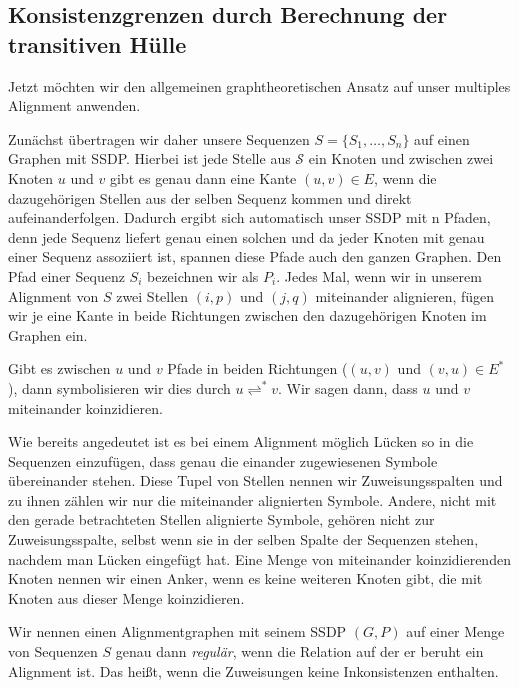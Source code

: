 \subsection{Konsistenzgrenzen durch Berechnung der transitiven Hülle}

Jetzt möchten wir den allgemeinen graphtheoretischen Ansatz auf unser multiples Alignment anwenden. 
	
\begin{definition}[Alignmentgraph]
	Zunächst übertragen wir daher unsere Sequenzen $S = \{S_1, \dots, S_n\}$ auf einen Graphen mit SSDP. Hierbei ist jede Stelle aus $\mathcal{S}$ ein Knoten und zwischen zwei Knoten $u$ und $v$ gibt es genau dann eine Kante $(u,v) \in E$, wenn die dazugehörigen Stellen aus der selben Sequenz kommen und direkt aufeinanderfolgen. Dadurch ergibt sich automatisch unser SSDP mit n Pfaden, denn jede Sequenz liefert genau einen solchen und da jeder Knoten mit genau einer Sequenz assoziiert ist, spannen diese Pfade auch den ganzen Graphen. Den Pfad einer Sequenz $S_i$ bezeichnen wir als $P_i$.
	Jedes Mal, wenn wir in unserem Alignment von $S$ zwei Stellen $(i,p)$ und $(j,q)$ miteinander alignieren, fügen wir je eine Kante in beide Richtungen zwischen den dazugehörigen Knoten im Graphen ein.
\end{definition}

Gibt es zwischen $u$ und $v$ Pfade in beiden Richtungen ($(u,v)$ und $(v,u) \in E^*$), dann symbolisieren wir dies durch $u \rightleftharpoons^{*} v$. Wir sagen dann, dass $u$ und $v$ miteinander koinzidieren. 

Wie bereits angedeutet ist es bei einem Alignment möglich Lücken so in die Sequenzen einzufügen, dass genau die einander zugewiesenen Symbole übereinander stehen. Diese Tupel von Stellen nennen wir Zuweisungsspalten und zu ihnen zählen wir nur die miteinander alignierten Symbole. Andere, nicht mit den gerade betrachteten Stellen alignierte Symbole, gehören nicht zur Zuweisungsspalte, selbst wenn sie in der selben Spalte der Sequenzen stehen, nachdem man Lücken eingefügt hat. Eine Menge von miteinander koinzidierenden Knoten nennen wir einen Anker, wenn es keine weiteren Knoten gibt, die mit Knoten aus dieser Menge koinzidieren.

Wir nennen einen Alignmentgraphen mit seinem SSDP $(G,P)$ auf einer Menge von Sequenzen $S$ genau dann \emph{regulär}, wenn die Relation auf der er beruht ein Alignment ist. Das heißt, wenn die Zuweisungen keine Inkonsistenzen enthalten.

